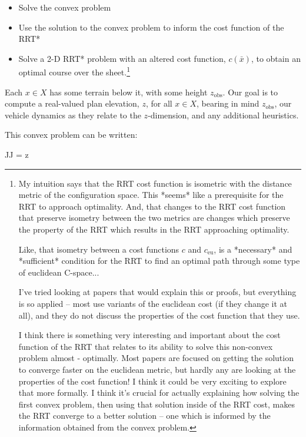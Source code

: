 \documentclass[letterpaper, 10 pt, conference]{ieeeconf}
\begin{document}
\begin{itemize}
    \item Solve the convex problem
    \item Use the solution to the convex problem to inform the cost function of the RRT*
    \item Solve a 2-D RRT* problem with an altered cost function, $c(\bar{x})$, to obtain an optimal course over the sheet.\footnote{
My intuition says that the RRT cost function is isometric with the distance metric of the configuration space. This *seems* like a prerequisite for the RRT to approach optimality. And, that changes to the RRT cost function that preserve isometry between the two metrics are changes which preserve the property of the RRT which results in the RRT approaching optimality.

Like, that isometry between a cost functions $c$ and $c_\text{eu}$, is a *necessary* and *sufficient* condition for the RRT to find an optimal path through some type of euclidean C-space...

I've tried looking at papers that would explain this or proofs, but everything is so applied -- most use variants of the euclidean cost (if they change it at all), and they do not discuss the properties of the cost function that they use.

I think there is something very interesting and important about the cost function of the RRT that relates to its ability to solve this non-convex problem almost - optimally. Most papers are focused on getting the solution to converge faster on the euclidean metric, but hardly any are looking at the properties of the cost function! I think it could be very exciting to explore that more formally. I think it's crucial for actually explaining how solving the first convex problem, then using that solution inside of the RRT cost, makes the RRT converge to a better solution -- one which is informed by the information obtained from the convex problem.}
\end{itemize}

Each $x \in X$ has some terrain below it, with some height $z_\text{obs}$. Our goal is to compute a real-valued plan elevation, $z$, for all $x \in X$, bearing in mind $z_\text{obs}$, our vehicle dynamics as they relate to the $z$-dimension, and any additional heuristics.

This convex problem can be written:

\begin{mini!}
{J}{J = z}
{\label{eq:Example1}}
{}
\end{mini!}
\end{document}
